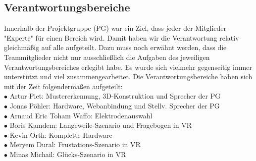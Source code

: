 \begin{figure}[h]
\end{figure} 



\subsection{Verantwortungsbereiche}
Innerhalb der Projektgruppe (PG) war ein Ziel, dass jeder der Mitglieder "Experte" für einen Bereich wird. Damit haben wir die Verantwortung relativ gleichmäßig auf alle aufgeteilt. Dazu muss noch erwähnt werden, dass die Teammitglieder nicht nur ausschließlich die Aufgaben des jeweiligen Verantwortungsbereiches erlegibt habe. Es wurde sich vielmehr gegenseitig immer unterstützt und viel zusammengearbeitet. Die Verantwortungsbereiche haben sich mit der Zeit folgendermaßen aufgeteilt: \\

$ \bullet $ Artur Piet: Mustererkennung, 3D-Konstruktion und Sprecher der PG \\
$ \bullet $ Jonas Pöhler: Hardware, Webanbindung und Stellv. Sprecher der PG \\
$ \bullet $ Arnaud Eric Toham Waffo: Elektrodenauswahl \\
$ \bullet $ Boris Kamdem: Langeweile-Szenario und Fragebogen in VR \\
$ \bullet $ Kevin Orth: Komplette Hardware \\
$ \bullet $ Meryem Dural: Frustations-Szenario in VR \\
$ \bullet $ Minas Michail: Glücks-Szenario in VR \\


